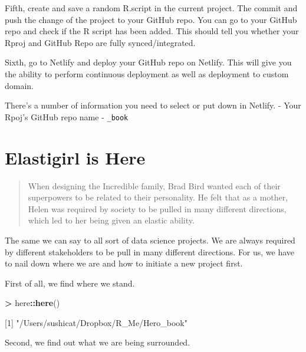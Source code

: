 \documentclass[]{book}
\newenvironment{Shaded}{\begin{snugshade}}{\end{snugshade}}
\newcommand{\DecValTok}[1]{\textcolor[rgb]{0.00,0.00,0.81}{#1}}
\newcommand{\KeywordTok}[1]{\textcolor[rgb]{0.13,0.29,0.53}{\textbf{#1}}}
\newcommand{\NormalTok}[1]{#1}
\newcommand{\OperatorTok}[1]{\textcolor[rgb]{0.81,0.36,0.00}{\textbf{#1}}}
\newcommand{\StringTok}[1]{\textcolor[rgb]{0.31,0.60,0.02}{#1}}
\begin{document}
Fifth, create and save a random R.script in the current project. The commit and push the change of the project to your GitHub repo. You can go to your GitHub repo and check if the R script has been added. This should tell you whether your Rproj and GitHub Repo are fully synced/integrated.

Sixth, go to Netlify and deploy your GitHub repo on Netlify. This will give you the ability to perform continuous deployment as well as deployment to custom domain.

There's a number of information you need to select or put down in Netlify.
- Your Rpoj's GitHub repo name
- \texttt{\_book}

\hypertarget{elastigirl-is-here}{%
\chapter{Elastigirl is Here}\label{elastigirl-is-here}}

\begin{quote}
When designing the Incredible family, Brad Bird wanted each of their superpowers to be related to their personality. He felt that as a mother, Helen was required by society to be pulled in many different directions, which led to her being given an elastic ability.
\end{quote}

The same we can say to all sort of data science projects. We are always required by different stakeholders to be pull in many different directions. For us, we have to nail down where we are and how to initiate a new project first.

First of all, we find where we stand.

\begin{Shaded}
\begin{Highlighting}[]
\OperatorTok{>}\StringTok{ }\NormalTok{here}\OperatorTok{::}\KeywordTok{here}\NormalTok{()}

\NormalTok{[}\DecValTok{1}\NormalTok{] }\StringTok{"/Users/sushicat/Dropbox/R_Me/Hero_book"}
\end{Highlighting}
\end{Shaded}

Second, we find out what we are being surrounded.
\end{document}
